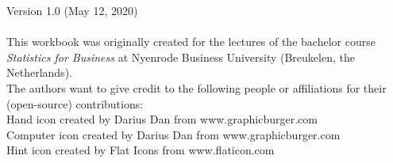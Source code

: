 \thispagestyle{emptyhead}

\vspace*{\fill} 

{\fontsize{8}{10}\selectfont

Version 1.0 (May 12, 2020) \\
\\
This workbook was originally created for the lectures of the bachelor course \textit{Statistics for Business} at Nyenrode Business University (Breukelen, the Netherlands). \\

The authors want to give credit to the following people or affiliations for their (open-source) contributions: \\

Hand icon created by Darius Dan from www.graphicburger.com \\
Computer icon created by Darius Dan from www.graphicburger.com \\
Hint icon created by Flat Icons from www.flaticon.com \\

}
